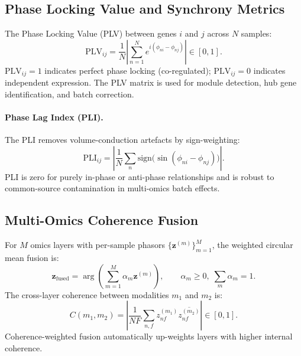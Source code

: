 \documentclass[preprint,12pt,amsmath,amssymb,superscriptaddress,floatfix]{revtex4-2}
\begin{document}
\subsection{Phase Locking Value and Synchrony Metrics}
\label{subsec:plv}

The Phase Locking Value (PLV) between genes $i$ and $j$ across $N$ samples:
\begin{equation}
    \mathrm{PLV}_{ij} = \frac{1}{N}\left|\sum_{n=1}^N
    e^{i(\phi_{ni} - \phi_{nj})}\right| \in [0,1].
\end{equation}
$\mathrm{PLV}_{ij} = 1$ indicates perfect phase locking (co-regulated);
$\mathrm{PLV}_{ij} = 0$ indicates independent expression.
The PLV matrix is used for module detection, hub gene identification, and batch correction.

\paragraph{Phase Lag Index (PLI).}
The PLI removes volume-conduction artefacts by sign-weighting:
\begin{equation}
    \mathrm{PLI}_{ij} = \left|\frac{1}{N}\sum_n
    \mathrm{sign}\!\bigl(\sin(\phi_{ni}-\phi_{nj})\bigr)\right|.
\end{equation}
PLI is zero for purely in-phase or anti-phase relationships and is
robust to common-source contamination in multi-omics batch effects.

\subsection{Multi-Omics Coherence Fusion}
\label{subsec:fusion}

For $M$ omics layers with per-sample phasors
$\{\boldsymbol{z}^{(m)}\}_{m=1}^M$, the weighted circular mean fusion is:
\begin{equation}
    \boldsymbol{z}_{\mathrm{fused}} = \arg\!\left(
    \sum_{m=1}^M \alpha_m \boldsymbol{z}^{(m)}\right), \qquad
    \alpha_m \geq 0,\; \sum_m \alpha_m = 1.
\end{equation}
The cross-layer coherence between modalities $m_1$ and $m_2$ is:
\begin{equation}
    C(m_1, m_2) = \left|\frac{1}{NF}\sum_{n,f}
    z_{nf}^{(m_1)}\overline{z_{nf}^{(m_2)}}\right| \in [0,1].
\end{equation}
Coherence-weighted fusion automatically up-weights layers with higher
internal coherence.
\end{document}

